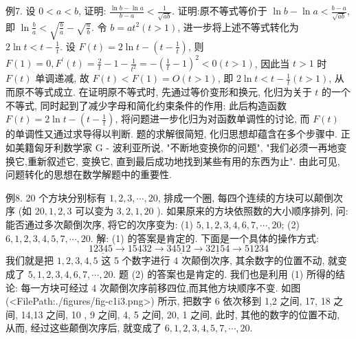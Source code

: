 例7. 设 $0<a<b$, 证明: $\frac{\ln b-\ln a}{b-a}<\frac{1}{\sqrt{a b}}$.
证明:原不等式等价于 $\ln b-\ln a<\frac{b-a}{\sqrt{a b}}$, 即 $\ln \frac{b}{a}<\sqrt{\frac{b}{a}}-\sqrt{\frac{a}{b}}$.
令 $b=a t^2(t>1)$, 进一步将上述不等式转化为 $2 \ln t<t-\frac{1}{t}$.
设 $F(t)=2 \ln t-\left(t-\frac{1}{t}\right)$, 则 $F(1)=0, F^{\prime}(t)=\frac{2}{t}-1-\frac{1}{t^2}= -\left(\frac{1}{t}-1\right)^2<0(t>1)$, 因此当 $t>1$ 时 $F(t)$ 单调递减, 故 $F(t)<F(1)= O(t>1)$, 即 $2 \ln t<t-\frac{1}{t}(t>1)$, 从而原不等式成立.
在证明原不等式时, 先通过等价变形和换元, 化归为关于 $t$ 的一个不等式, 同时起到了减少字母和简化约束条件的作用; 此后构造函数 $F(t)=2 \ln t-\left(t-\frac{1}{t}\right)$, 将问题进一步化归为对函数单调性的讨论, 而 $F(t)$ 的单调性又通过求导得以判断.
题的求解很简短, 化归思想却蕴含在多个步骤中.
正如美籍匈牙利数学家 $\mathrm{G}$ - 波利亚所说, "不断地变换你的问题", "我们必须一再地变换它,重新叙述它, 变换它, 直到最后成功地找到某些有用的东西为止". 由此可见, 问题转化的思想在数学解题中的重要性.



例8. 20 个方块分别标有 $1,2,3, \cdots, 20$, 排成一个圈, 每四个连续的方块可以颠倒次序 (如 $20,1,2,3$ 可以变为 $3,2,1,20$ ). 如果原来的方块依照数的大小顺序排列, 问: 能否通过多次颠倒次序, 将它的次序变为:
(1) $5,1,2,3,4,6,7, \cdots, 20$;
(2) $6,1,2,3,4,5,7, \cdots, 20$.
解: (1) 的答案是肯定的.
下面是一个具体的操作方式:
$$
1 \underline{2345} \rightarrow \underline{15432} \rightarrow 3 \underline{4512} \rightarrow \underline{32154} \rightarrow 51234
$$
我们就是把 $1,2,3,4,5$ 这 5 个数字进行 4 次颠倒次序, 其余数字的位置不动, 就变成了 $5,1,2,3,4,6,7, \cdots, 20$.
题 (2) 的答案也是肯定的.
我们也是利用 (1) 所得的结论: 每一方块可经过 4 次颠倒次序前移四位,而其他方块顺序不变.
如图(<FilePath:./figures/fig-c1i3.png>) 所示, 把数字 6 依次移到 1,2 之间, 17, 18 之间, 14,13 之间, 10 , 9 之间, 4, 5 之间, 20, 1 之间, 此时, 其他的数字的位置不动, 从而, 经过这些颠倒次序后, 就变成了 $6,1,2,3,4,5,7, \cdots, 20$.



